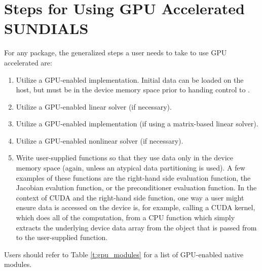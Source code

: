 \section{Steps for Using GPU Accelerated SUNDIALS}\label{s:gpu_usage}

For any {\sundials} package, the generalized steps a user needs to take
to use GPU accelerated {\sundials} are:
\begin{enumerate}
  \item Utilize a GPU-enabled {\nvector} implementation.  Initial
  data can be loaded on the host, but must be in the device memory
  space prior to handing control to {\sundials}.
  \item Utilize a GPU-enabled {\sunlinsol} linear solver (if necessary).
  \item Utilize a GPU-enabled {\sunmatrix} implementation (if using a
  matrix-based linear solver).
  \item Utilize a GPU-enabled {\sunnonlinsol} nonlinear solver (if necessary).
  \item Write user-supplied functions so that they use data only in the
  device memory space (again, unless an atypical data partitioning is used).
  A few examples of these functions are the right-hand side evaluation
  function, the Jacobian evalution function, or the preconditioner evaluation
  function.  In the context of CUDA and the right-hand side function, one way a
  user might ensure data is accessed on the device is, for example, calling a
  CUDA kernel, which does all of the computation, from a CPU function which simply
  extracts the underlying device data array from the {\nvector} object that is
  passed from {\sundials} to the user-supplied function.
\end{enumerate}
Users should refer to Table \ref{t:gpu_modules} for a list of GPU-enabled
native {\sundials} modules.
